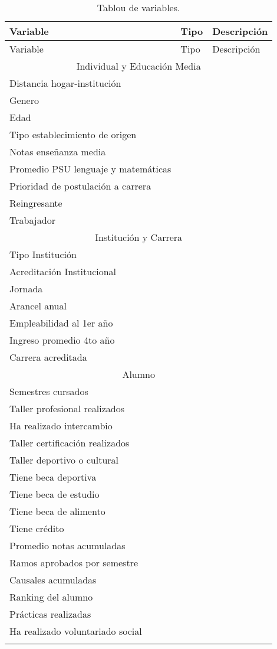 \begin{longtable}{|l|l|l|}
			\hline
			Variable & Tipo & Descripción \\
			\hline \hline
			\endfirsthead
			
			\hline
            Variable & Tipo & Descripción \\
            \hline \hline
            \endhead
			
			\multicolumn{3}{c}{Individual y Educación Media} \\ \hline
			Distancia hogar-institución &  & \\ \hline
			Genero &  & \\ \hline
			Edad &  & \\ \hline
			Tipo establecimiento de origen &  & \\ \hline
			Notas enseñanza media & & \\ \hline
			Promedio PSU lenguaje y matemáticas &  & \\ \hline
			Prioridad de postulación a carrera & & \\ \hline
			Reingresante & & \\ \hline
			Trabajador & & \\ \hline 
			\multicolumn{3}{c}{Institución y Carrera} \\ \hline
			Tipo Institución &  & \\ \hline
			Acreditación Institucional &  & \\ \hline
			Jornada &  & \\ \hline
			Arancel anual & & \\ \hline
			Empleabilidad al 1er año & & \\ \hline
			Ingreso promedio 4to año & & \\ \hline
			Carrera acreditada & & \\ \hline 
			\multicolumn{3}{c}{Alumno} \\ \hline
			Semestres cursados & & \\ \hline
			Taller profesional realizados & & \\ \hline
			Ha realizado intercambio & & \\ \hline
			Taller certificación realizados & & \\ \hline
			Taller deportivo o cultural & & \\ \hline
			Tiene beca deportiva & & \\ \hline
			Tiene beca de estudio &  & \\ \hline
			Tiene beca de alimento & & \\ \hline
			Tiene crédito &  & \\ \hline
			Promedio notas acumuladas &  & \\ \hline
			Ramos aprobados por semestre & & \\ \hline
			Causales acumuladas & & \\ \hline
			Ranking del alumno & & \\ \hline
			Prácticas realizadas & & \\ \hline
			Ha realizado voluntariado social & & \\ \hline
		\caption{Tablou de variables.}
		\label{tabla:Tablou de variables}
\end{longtable}	

